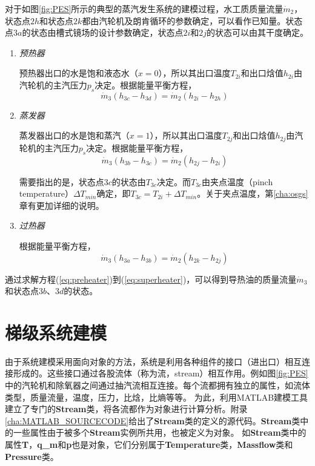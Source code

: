 对于如图\ref{fig:PES}所示的典型的蒸汽发生系统的建模过程，水工质质量流量$\dot{m}_2$，状态点$2h$和状态点$2k$都由汽轮机及朗肯循环的参数确定，可以看作已知量。状态点$3a$的状态由槽式镜场的设计参数确定，状态点$2i$和$2j$的状态可以由其干度确定。

\begin{enumerate}[label=(\arabic*)]
  \item \emph{预热器}
  
\setlength\parindent{2em}预热器出口的水是饱和液态水（$x = 0$），所以其出口温度$T_{2i}$和出口焓值$h_{2i}$由汽轮机的主汽压力$p_s$决定。根据能量平衡方程，
  \begin{equation}
  \dot{m}_3 (h_{3c}-h_{3d})=\dot{m}_2 (h_{2i} - h_{2h})
  \label{eq:preheater}
\end{equation}

  \item \emph{蒸发器}
  
  蒸发器出口的水是饱和蒸汽（$x = 1$），所以其出口温度$T_{2j}$和出口焓值$h_{2j}$由汽轮机的主汽压力$p_s$决定。根据能量平衡方程，
  \begin{equation}
  \dot{m}_3 (h_{3b}-h_{3c})=\dot{m}_2 (h_{2j} - h_{2i})
  \label{eq:evaporator}
\end{equation}

	需要指出的是，状态点$3c$的状态由$T_{3c}$决定。而$T_{3c}$由夹点温度（pinch temperature）$\Delta T_{min}$确定，即$T_{3c} = T_{2i} + \Delta T_{min}$。关于夹点温度，第\ref{cha:osgs}章有更加详细的说明。
  
  \item \emph{过热器}
  
  根据能量平衡方程，
  \begin{equation}
  \dot{m}_3 (h_{3a}-h_{3b})=\dot{m}_2 (h_{2k} - h_{2j})
  \label{eq:superheater}
\end{equation}

\end{enumerate}

通过求解方程(\ref{eq:preheater})到(\ref{eq:superheater})，可以得到导热油的质量流量$\dot{m}_3$和状态点$3b$、$3d$的状态。

\section{梯级系统建模}

由于系统建模采用面向对象的方法，系统是利用各种组件的接口（进出口）相互连接形成的。这些接口通过各股流体（称为流，stream）相互作用。例如图\ref{fig:PES}中的汽轮机和除氧器之间通过抽汽流相互连接。每个流都拥有独立的属性，如流体类型，质量流量，温度，压力，比焓，比熵等等。
为此，利用MATLAB建模工具建立了专门的\textbf{Stream}类，将各流都作为对象进行计算分析。附录\ref{cha:MATLAB_SOURCECODE}给出了\textbf{Stream}类的定义的源代码。\textbf{Stream}类中的一些属性由于被多个\textbf{Stream}实例所共用，也被定义为对象。
如\textbf{Stream}类中的属性\textbf{T}，\textbf{q\_m}和\textbf{p}也是对象，它们分别属于\textbf{Temperature}类，\textbf{Massflow}类和\textbf{Pressure}类。

